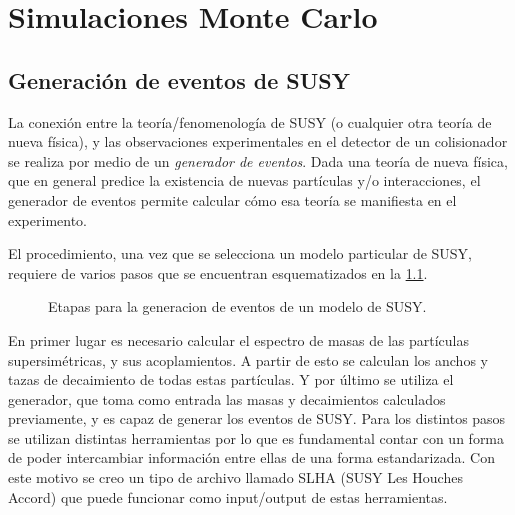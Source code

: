 \chapter{Simulaciones Monte Carlo}


\newcommand{\mccaption}{La sección eficaz a LO para cada modo de decaimiento,
  los factores $k$ (para la normalización NLO) y las eficiencias del filtro
  están detalladas, así como también la luminosidad integrada correspondiente
  a la estadística total de cada muestra.}


\section{Generación de eventos de SUSY}

La conexión entre la teoría/fenomenología de SUSY (o cualquier otra teoría de
nueva física), y las observaciones experimentales en el detector de un
colisionador se realiza por medio de un \emph{generador de eventos}. Dada una
teoría de nueva física, que en general predice la existencia de nuevas
partículas y/o interacciones, el generador de eventos permite calcular cómo esa
teoría se manifiesta en el experimento.

El procedimiento, una vez que se selecciona un modelo particular de SUSY,
requiere de varios pasos que se encuentran esquematizados en la
\cref{fig:mc_sketch}.

\begin{figure}[h]
  \centering
  \scalebox{0.8}{}
  \caption{Etapas para la generacion de eventos de un modelo de SUSY.}
  \label{fig:mc_sketch}
\end{figure}


En primer lugar es necesario calcular el espectro de masas de las partículas
supersimétricas, y sus acoplamientos. A partir de esto se calculan los anchos y
tazas de decaimiento de todas estas partículas. Y por último se utiliza el
generador, que toma como entrada las masas y decaimientos calculados previamente,
y es capaz de generar los eventos de SUSY. Para los distintos pasos se utilizan
distintas herramientas por lo que es fundamental contar con un forma de poder
intercambiar información entre ellas de una forma estandarizada. Con este motivo
se creo un tipo de archivo llamado SLHA (SUSY Les Houches Accord)\cite{SLHA} que
puede funcionar como input/output de estas herramientas.

